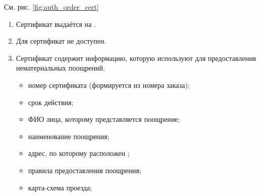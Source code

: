                     \par{
                    См. рис. \ref{fig:auth_order_cert}
                    }

                \begin{enumerate}
                    \item Сертификат выдаётся на .
                    \item Для  сертификат не доступен.
                    \item Сертификат содержит информацию, которую
                         используют для предоставления
                        нематериальных поощрений.
                        \begin{itemize}
                            \item номер сертификата (формируется из номера
                            заказа);
                            \item срок действия;
                            \item ФИО лица, которому представляется поощрение;
                            \item наименование поощрения;
                            \item адрес, по которому расположен
                                ;
                            \item правила предоставления поощрения;
                            \item карта-схема проезда;
                        \end{itemize}
                \end{enumerate}

